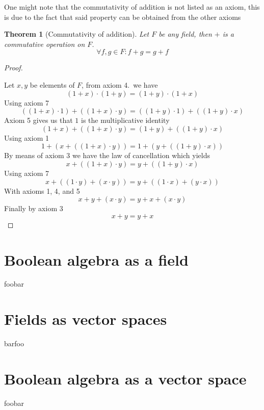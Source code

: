 \documentclass{article}
\newtheorem*{theorem}{Theorem}
\begin{document}
One might note that the commutativity of addition is not listed as an axiom,
this is due to the fact that said property can be obtained from the other axioms

\begin{theorem}[Commutativity of addition]

  Let $F$ be any field, then $+$ is a commutative operation on $F$.
  $$\forall f,g \in F :  f + g = g + f$$
\end{theorem}
\begin{proof}\cite{addcomm}

Let $x, y$ be elements of $F$, from axiom 4.\ we have
$$(1+x)\cdot(1+y)=(1+y)\cdot(1+x)$$
Using axiom 7
$$((1+x)\cdot 1)+((1+x)\cdot y) = ((1+y)\cdot 1)+((1+y)\cdot x)$$
Axiom 5 gives us that $1$ is the multiplicative identity
$$(1+x)+((1+x)\cdot y) = (1+y)+((1+y)\cdot x)$$
Using axiom 1
$$1+(x+((1+x)\cdot y)) = 1+(y+((1+y)\cdot x))$$
By means of axiom 3 we have the law of cancellation which yields
$$x+((1+x)\cdot y) = y+((1+y)\cdot x)$$
Using axiom 7
$$x+((1\cdot y)+(x\cdot y)) = y+((1\cdot x)+(y\cdot x))$$
With axioms 1, 4, and 5
$$x+y+(x\cdot y) = y+x+(x\cdot y)$$
Finally by axiom 3
$$x+y=y+x$$
\end{proof}
\section{Boolean algebra as a field}
\label{sec:Boolean algebra as a field}

foobar

\section{Fields as vector spaces}
\label{sec:Fields as vector spaces}

barfoo

\section{Boolean algebra as a vector space}
\label{sec:Boolean algebra as a vector space}

foobar

\newpage



\end{document}
